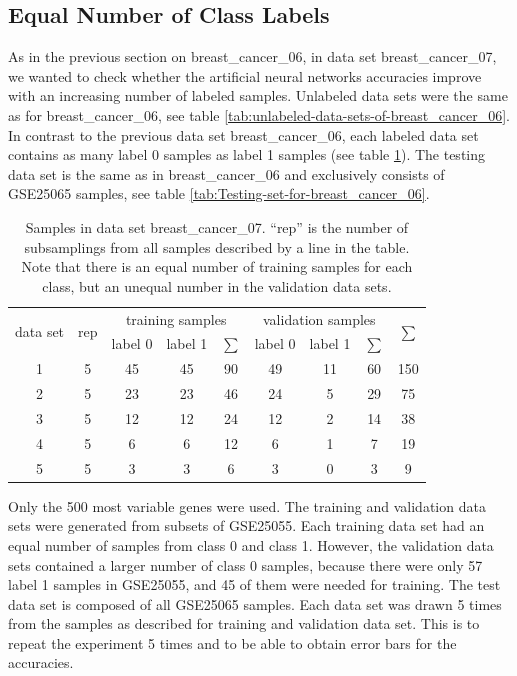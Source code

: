 \subsection{Equal Number of Class Labels \label{subsec:Increasing-number-of-labeled-samples-and-equal-number-of-class-labels}}

As in the previous section on breast\_cancer\_06, in data set breast\_cancer\_07,
we wanted to check whether the artificial neural networks accuracies
improve with an increasing number of labeled samples. Unlabeled data
sets were the same as for breast\_cancer\_06, see table \vref{tab:unlabeled-data-sets-of-breast_cancer_06}.
In contrast to the previous data set breast\_cancer\_06, each labeled
data set contains as many label 0 samples as label 1 samples (see
table \ref{tab:Data-set-breast_cancer_07}). The testing data set
is the same as in breast\_cancer\_06 and exclusively consists of GSE25065
samples, see table \vref{tab:Testing-set-for-breast_cancer_06}.

\begin{table}
\noindent \begin{centering}
\begin{tabular}{|c|c|c|c|c|c|c|c|c|}
\hline 
\multirow{2}{*}{data set} & \multirow{2}{*}{rep} & \multicolumn{3}{c|}{training samples} & \multicolumn{3}{c|}{validation samples} & \multirow{2}{*}{$\sum$}\tabularnewline
\cline{3-8} 
 &  & label 0 & label 1 & $\sum$ & label 0 & label 1 & $\sum$ & \tabularnewline
\hline 
\hline 
1 & 5 & 45 & 45 & 90 & 49 & 11 & 60 & 150\tabularnewline
\hline 
2 & 5 & 23 & 23 & 46 & 24 & 5 & 29 & 75\tabularnewline
\hline 
3 & 5 & 12 & 12 & 24 & 12 & 2 & 14 & 38\tabularnewline
\hline 
4 & 5 & 6 & 6 & 12 & 6 & 1 & 7 & 19\tabularnewline
\hline 
5 & 5 & 3 & 3 & 6 & 3 & 0 & 3 & 9\tabularnewline
\hline 
\end{tabular}
\par\end{centering}
\caption[Samples in data set breast\_cancer\_07.]{\label{tab:Data-set-breast_cancer_07}Samples in data set breast\_cancer\_07.
``rep'' is the number of subsamplings from all samples described
by a line in the table. Note that there is an equal number of training
samples for each class, but an unequal number in the validation data
sets.}
\end{table}

Only the 500 most variable genes were used. The training and validation
data sets were generated from subsets of GSE25055. Each training data
set had an equal number of samples from class 0 and class 1. However,
the validation data sets contained a larger number of class 0 samples,
because there were only 57 label 1 samples in GSE25055, and 45 of
them were needed for training. The test data set is composed of all
GSE25065 samples. Each data set was drawn 5 times from the samples
as described for training and validation data set. This is to repeat
the experiment 5 times and to be able to obtain error bars for the
accuracies.

